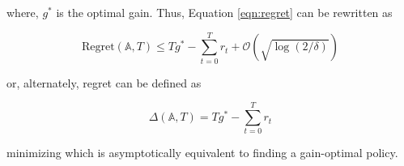 where, $g^*$ is the optimal gain. Thus, Equation \ref{eqn:regret} can be rewritten as

\begin{equation*}
    \text{Regret}(\mathbb{A}, T) \le T g^* - \sum_{t = 0}^T r_t + \mathcal{O}(\sqrt{\log(2/\delta)})
\end{equation*}

or, alternately, regret can be defined as

\begin{equation}
    \label{eqn:theogregret}
    \Delta(\mathbb{A}, T) =  T g^* - \sum_{t = 0}^T r_t
\end{equation}

minimizing which is asymptotically equivalent to finding a gain-optimal policy.


